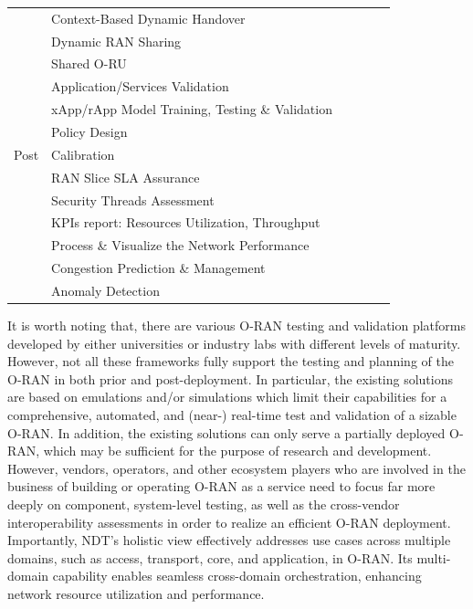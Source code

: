 \documentclass[]{IEEEtran}
\begin{document}
\begin{table}[htbp]
{\begin{tabular}{p{1.8cm}|p{6.3cm}| p{1.5cm} p{1.5cm} p{1.5cm} p{1.3cm} }
				& Context-Based Dynamic Handover &  &  \hfil \checkmark & \hfil \checkmark  & \hfil \checkmark  \\
				& Dynamic RAN Sharing &  &  \hfil \checkmark &   \hfil \checkmark&  \hfil \checkmark \\
				& Shared O-RU &  &  \hfil \checkmark &  \hfil \checkmark & \hfil \checkmark  \\
				& Application/Services Validation &  \hfil \checkmark &  \hfil \checkmark & \hfil \checkmark  &  \hfil \checkmark \\
				& xApp/rApp Model Training, Testing \& Validation  & \hfil \checkmark &   &  \hfil \checkmark &   \\
				& Policy Design & \hfil \checkmark &  &  \hfil \checkmark &   \\
	\hfil Post	& Calibration &  & \hfil \checkmark &  \hfil \checkmark &   \\
			\cline{2-2}
			& RAN Slice SLA Assurance &   &  \hfil \checkmark &  \hfil \checkmark &  \hfil \checkmark \\
			& Security Threads Assessment  &   & \hfil \checkmark & \hfil \checkmark  &  \hfil \checkmark\\
			& KPIs report: Resources Utilization, Throughput &   & \hfil \checkmark &  \hfil \checkmark & \hfil \checkmark \\
			& Process \& Visualize the Network Performance  &   & \hfil \checkmark & &  \hfil \checkmark \\
			& Congestion Prediction \& Management &   & \hfil \checkmark & \hfil \checkmark  &  \hfil \checkmark \\
			& Anomaly Detection  &   & \hfil \checkmark &  \hfil \checkmark &  \hfil \checkmark \\
			\hline
		\end{tabular}}
	\end{table}


	
	
	It is worth noting that, there are various O-RAN testing and validation platforms developed by either universities or industry labs with different levels of maturity. However, not all these  frameworks fully support the testing and planning of the O-RAN in both prior and post-deployment. In particular, the existing solutions are based on emulations and/or simulations which limit their capabilities for a comprehensive, automated, and (near-) real-time test and validation of a sizable O-RAN. In addition, the existing solutions can only serve a partially deployed O-RAN, which may be sufficient for the purpose of research and development. However, vendors, operators, and other ecosystem players who are involved in the business of building or operating O-RAN as a service need to focus far more deeply on component, system-level testing, as well as the cross-vendor interoperability assessments in order to realize an efficient O-RAN deployment. Importantly, NDT's holistic view effectively addresses use cases across multiple domains, such as access, transport, core, and application, in O-RAN. Its multi-domain capability enables seamless cross-domain orchestration, enhancing network resource utilization and performance.
	
\end{document}

